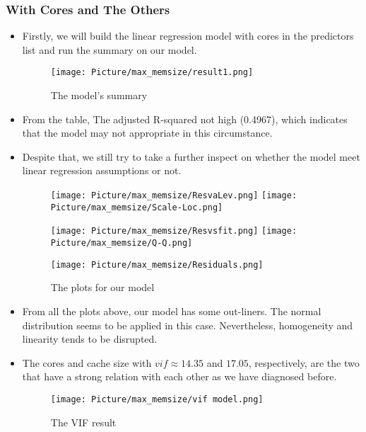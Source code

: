 \documentclass[a4paper]{article}
\begin{document}
\subsubsection{With Cores and The Others}
\begin{itemize}
    \item[] Firstly, we will build the linear regression model with cores in the predictors list and run the summary on our model.
    
    \begin{figure}[H]
        \centering
        \texttt{[image: Picture/max\_memsize/result1.png]}
        \caption{The model's summary}
        \label{8.3.1}
    \end{figure} 
    \item[] From the table, The adjusted R-squared not high (0.4967), which indicates that the model may not appropriate in this circumstance.
    
    \item[] Despite that, we still try to take a further inspect on whether the model meet linear regression assumptions or not.
    
    \begin{figure}[H]
        \centering
        \texttt{[image: Picture/max\_memsize/ResvaLev.png]}
        \texttt{[image: Picture/max\_memsize/Scale-Loc.png]}
        \label{8.3.2}
    \end{figure}
    
    \begin{figure}[H]
        \centering
        \texttt{[image: Picture/max\_memsize/Resvsfit.png]}
        \texttt{[image: Picture/max\_memsize/Q-Q.png]}
        \label{8.3.3}
    \end{figure}
    
    \begin{figure}[H]
        \centering
        \texttt{[image: Picture/max\_memsize/Residuals.png]}
        \caption{The plots for our model}
        \label{8.3.4}
    \end{figure}
    
    \item[] From all the plots above, our model has some out-liners. The normal distribution seems to be applied in this case. Nevertheless, homogeneity and linearity tends to be disrupted. 
    
    \item[] The cores and cache size with $ vif \approx 14.35$ and $17.05$, respectively, are the two that have a strong relation with each other as we have diagnosed before.
    \begin{figure}[H]
        \centering
        \texttt{[image: Picture/max\_memsize/vif model.png]}
        \caption{The VIF result}
        \label{8.3.4}
    \end{figure}
    

\end{itemize}
\end{document}
